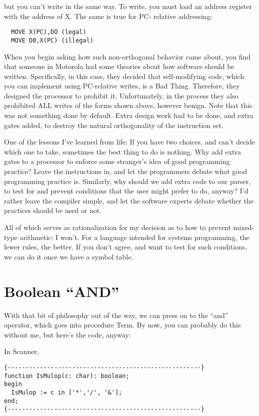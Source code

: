 but you can't write in the same way. To write, you must load an address register with the address of X. The same is true for PC- relative addressing:

\begin{verbatim}
  MOVE X(PC),DO (legal)
  MOVE D0,X(PC) (illegal)
\end{verbatim}

When you begin asking how such non-orthogonal behavior came about, you find that someone in Motorola had some theories about how software should be written. Specifically, in this case, they decided that self-modifying code, which you can implement using PC-relative writes, is a Bad Thing. Therefore, they designed the processor to prohibit it. Unfortunately, in the process they also prohibited  ALL  writes of the forms shown above, however benign. Note that this was not something done by default. Extra design work had to be done, and extra gates added, to destroy the natural orthogonality of the instruction set.

One of the lessons I've learned from life: If you have two choices, and can't decide which one to take, sometimes the best thing to do is nothing. Why add extra gates to a processor to enforce some stranger's idea of good programming practice?  Leave the instructions in, and let the programmers debate what good programming practice is. Similarly, why should we add extra code to our parser, to test for and prevent conditions that the user might prefer to do, anyway?  I'd rather leave the compiler simple, and let the software experts debate whether the practices should be used or not.

All of which serves as rationalization for my decision as to how to prevent mixed-type arithmetic:  I won't. For a language intended for systems programming, the fewer rules, the better. If you don't agree, and want to test for such conditions, we can do it once we have a symbol table.

\section{Boolean ``AND''}

With that bit of philosophy out of the way, we can press on to the ``and'' operator, which goes into procedure Term. By now, you can probably do this without me, but here's the code, anyway:

In Scanner,

\begin{verbatim}
{------------------------------------------------------}
function IsMulop(c: char): boolean;
begin
  IsMulop := c in ['*','/', '&'];
end;
{------------------------------------------------------}
\end{verbatim}

